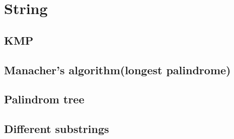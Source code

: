 \newpage
\section{String}

\subsection{KMP}


\subsection{Manacher's algorithm(longest palindrome)}
%

\subsection{Palindrom tree}
%

\subsection{Different substrings}
%